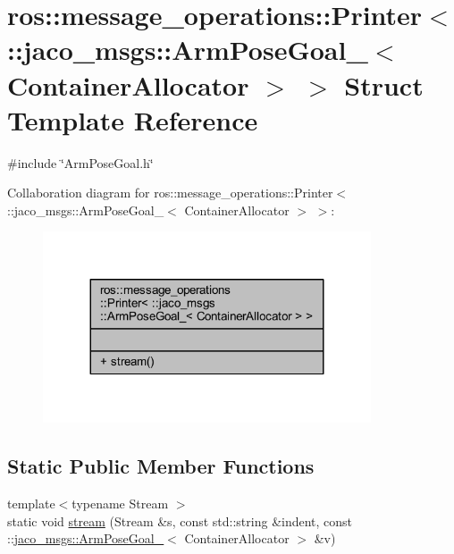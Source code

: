 \hypertarget{structros_1_1message__operations_1_1Printer_3_01_1_1jaco__msgs_1_1ArmPoseGoal___3_01ContainerAllocator_01_4_01_4}{}\section{ros\+:\+:message\+\_\+operations\+:\+:Printer$<$ \+:\+:jaco\+\_\+msgs\+:\+:Arm\+Pose\+Goal\+\_\+$<$ Container\+Allocator $>$ $>$ Struct Template Reference}
\label{structros_1_1message__operations_1_1Printer_3_01_1_1jaco__msgs_1_1ArmPoseGoal___3_01ContainerAllocator_01_4_01_4}


{\ttfamily \#include \char`\"{}Arm\+Pose\+Goal.\+h\char`\"{}}



Collaboration diagram for ros\+:\+:message\+\_\+operations\+:\+:Printer$<$ \+:\+:jaco\+\_\+msgs\+:\+:Arm\+Pose\+Goal\+\_\+$<$ Container\+Allocator $>$ $>$\+:
\nopagebreak
\begin{figure}[H]
\begin{center}
\leavevmode
\includegraphics[width=275pt]{d5/dc3/structros_1_1message__operations_1_1Printer_3_01_1_1jaco__msgs_1_1ArmPoseGoal___3_01ContainerAllocator_01_4_01_4__coll__graph}
\end{center}
\end{figure}
\subsection*{Static Public Member Functions}
\begin{DoxyCompactItemize}
\item 
{\footnotesize template$<$typename Stream $>$ }\\static void \hyperlink{structros_1_1message__operations_1_1Printer_3_01_1_1jaco__msgs_1_1ArmPoseGoal___3_01ContainerAllocator_01_4_01_4_ae60c2da5eae342b59c0a26effed778ab}{stream} (Stream \&s, const std\+::string \&indent, const \+::\hyperlink{structjaco__msgs_1_1ArmPoseGoal__}{jaco\+\_\+msgs\+::\+Arm\+Pose\+Goal\+\_\+}$<$ Container\+Allocator $>$ \&v)
\end{DoxyCompactItemize}


